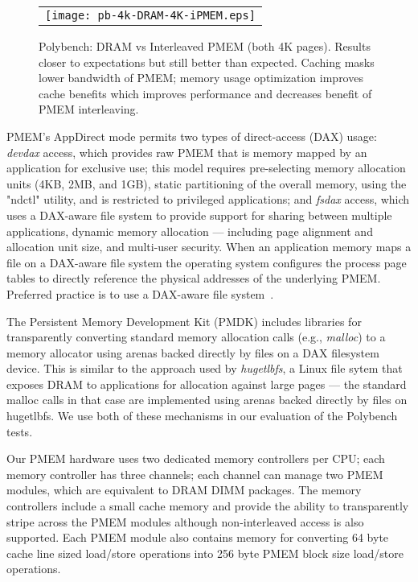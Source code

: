 %
%


\begin{figure}[!th]
  \captionsetup{justification=centering}
  \centering
  \caption{Polybench: DRAM vs Interleaved PMEM (both 4K pages).  Results closer to expectations but still better than expected.  Caching masks lower bandwidth of PMEM; memory usage optimization improves cache benefits which improves performance and decreases benefit of PMEM interleaving.}
  \vspace{2mm}
  \label{fig:polybench:dram-vs-ipmem-4k}
  \begin{tabular}{c}
    \texttt{[image: pb-4k-DRAM-4K-iPMEM.eps]}
  \end{tabular}
\end{figure}


PMEM's AppDirect mode permits two types of direct-access (DAX) usage: \textit{devdax} access, which provides raw PMEM that is memory mapped by an application for exclusive use; this model requires pre-selecting memory allocation units (4KB, 2MB, and 1GB), static partitioning of the overall memory, using the "ndctl" utility, and is restricted to privileged applications; and \textit{fsdax} access, which uses a DAX-aware file system to provide support for sharing between multiple applications, dynamic memory allocation --- including page alignment and allocation unit size, and multi-user security.  When an application memory maps a file on a DAX-aware file system the operating system configures the process page tables to directly reference the physical addresses of the underlying PMEM.  Preferred practice is to use a DAX-aware file system~\cite{rudoff2019NVMProgrammingModel}.


The Persistent Memory Development Kit (PMDK) includes libraries for transparently converting standard memory allocation calls (e.g., \textit{malloc}) to a memory allocator using arenas backed directly by files on a DAX filesystem device.  This is similar to the approach used by \textit{hugetlbfs}, a Linux file sytem that exposes DRAM to applications for allocation against large pages --- the standard malloc calls in that case are implemented using arenas backed directly by files on hugetlbfs.  We use both of these mechanisms in our evaluation of the Polybench tests.

Our PMEM hardware uses two dedicated memory controllers per CPU; each memory controller has three channels; each channel can manage two PMEM modules, which are equivalent to DRAM DIMM packages.   The memory controllers include a small cache memory and provide the ability to transparently stripe across the PMEM modules although non-interleaved access is also supported.  Each PMEM module also contains memory for converting 64 byte cache line sized load/store operations into 256 byte PMEM block size load/store operations.

